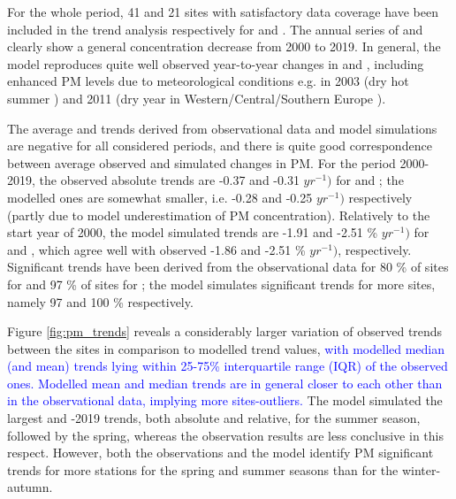 For the whole period, 41 and 21 sites with satisfactory data coverage have been included in the trend analysis respectively for \PM[10] and \PM[2.5]. The annual series of \PM[10] and \PM[2.5] clearly show a general concentration decrease from 2000 to 2019. In general, the model reproduces quite well observed year-to-year changes in \PM[10] and \PM[2.5], including enhanced PM levels due to meteorological conditions e.g. in 2003 (dry hot summer \citep{EMEP:PM2005}) and 2011 (dry year in Western/Central/Southern Europe \citep{EMEP:PM2013}).

The average \PM[10] and \PM[2.5] trends derived from observational data and model simulations are negative for all considered periods, and there is quite good correspondence between average observed and simulated changes in PM. %
For the period 2000-2019, the observed absolute trends are -0.37 and -0.31 \ug $yr^{-1})$ for \PM[10] and \PM[2.5]; the modelled ones are somewhat smaller, i.e. -0.28 and -0.25 \ug $yr^{-1})$ respectively (partly due to model underestimation of PM concentration). Relatively to the start year of 2000, the model simulated trends are -1.91 and -2.51 \% $yr^{-1})$ for \PM[10] and \PM[2.5], which agree well with observed -1.86 and -2.51 \% $yr^{-1})$, respectively. Significant trends have been derived from the observational data for 80 \% of sites for \PM[10] and 97 \% of sites for \PM[2.5]; the model simulates significant trends for more sites, namely 97 and 100 \% respectively.  

Figure \ref{fig:pm_trends} reveals a considerably larger variation of observed trends between the sites in comparison to modelled trend values, \textcolor{blue}{with modelled median (and mean) trends lying within 25-75\% interquartile range (IQR) of the observed ones. Modelled mean and median trends are in general closer to each other than in the observational data, implying more sites-outliers.} The model simulated the largest \PM[10] and -2019 trends, both absolute and relative,  for the summer season, followed by the spring, whereas the observation results are less conclusive in this respect. However, both the observations and the model identify PM significant trends for more stations for the spring and summer seasons than for the winter-autumn. 

